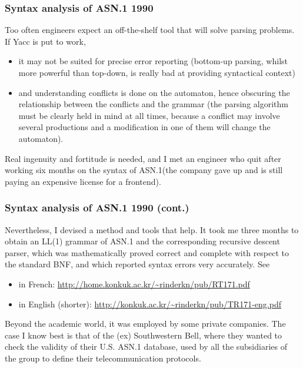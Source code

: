 \documentclass[compress,dvips,xcolor={dvipsnames},t]{beamer}
\newcommand\ASN{\textsf{ASN.1}\xspace}
\begin{document}

\begin{frame}
\frametitle{Syntax analysis of \ASN 1990}

Too often engineers expect an off-the-shelf tool that will solve
parsing problems. If Yacc is put to work,
\begin{itemize}

\item it may not be suited for precise error reporting (bottom-up
  parsing, whilst more powerful than top-down, is really bad at
  providing syntactical context)

\item and understanding conflicts is done on the automaton, hence
  obscuring the relationship between the conflicts and the grammar
  (the parsing algorithm must be clearly held in mind at all times,
  because a conflict may involve several productions and a
  modification in one of them will change the automaton).

\end{itemize}

\bigskip

Real ingenuity and fortitude is needed, and I met an engineer who quit
after working six months on the syntax of \ASN (the company gave up
and is still paying an expensive license for a frontend).

\end{frame}


\begin{frame}
\frametitle{Syntax analysis of \ASN 1990 (cont.)}

Nevertheless, I devised a method and tools that help. It took me three
months to obtain an LL(1) grammar of \ASN and the corresponding
recursive descent parser, which was mathematically proved correct and
complete with respect to the standard BNF, and which reported syntax
errors very accurately. See
\begin{itemize}

  \item in French:
{\small\url{http://home.konkuk.ac.kr/~rinderkn/pub/RT171.pdf}}

  \item in English (shorter):
{\small\url{http://konkuk.ac.kr/~rinderkn/pub/TR171-eng.pdf}}

\end{itemize}
Beyond the academic world, it was employed by some private
companies. The case I know best is that of the (ex) Southwestern Bell,
where they wanted to check the validity of their U.S. \ASN database,
used by all the subsidiaries of the group to define their
telecommunication protocols.

\end{frame}
\end{document}
